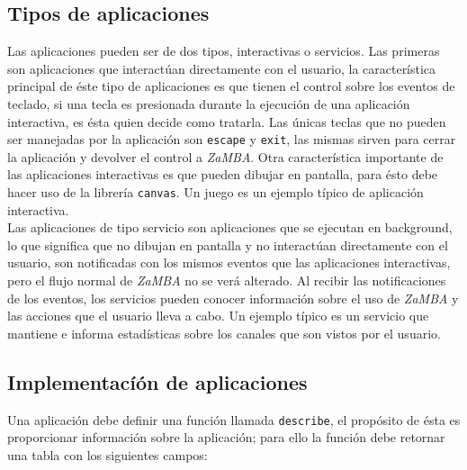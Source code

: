 \subsection{Tipos de aplicaciones}
Las aplicaciones pueden ser de dos tipos, interactivas o servicios. Las primeras son aplicaciones que interactúan directamente con el usuario, la característica principal de éste tipo de aplicaciones es que tienen el control sobre los eventos de teclado, si una tecla es presionada durante la ejecución de una aplicación interactiva, es ésta quien decide como tratarla. Las únicas teclas que no pueden ser manejadas por la aplicación son \texttt{escape} y \texttt{exit}, las mismas sirven para cerrar la aplicación y devolver el control a \emph{ZaMBA}. Otra característica importante de las aplicaciones interactivas es que pueden dibujar en pantalla, para ésto debe hacer uso de la librería \texttt{canvas}. Un juego es un ejemplo típico de aplicación interactiva.\\
Las aplicaciones de tipo servicio son aplicaciones que se ejecutan en background, lo que significa que no dibujan en pantalla y no interactúan directamente con el usuario, son notificadas con los mismos eventos que las aplicaciones interactivas, pero el flujo normal de \emph{ZaMBA} no se verá alterado. Al recibir las notificaciones de los eventos, los servicios pueden conocer información sobre el uso de \emph{ZaMBA} y las acciones que el usuario lleva a cabo. Un ejemplo típico es un servicio que mantiene e informa estadísticas sobre los canales que son vistos por el usuario.

\subsection{Implementacíón de aplicaciones}

Una aplicación debe definir una función llamada \texttt{describe}, el propósito de ésta es proporcionar información sobre la aplicación; para ello la función debe retornar una tabla con los siguientes campos:

